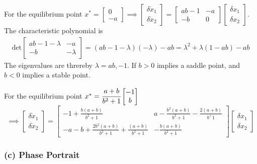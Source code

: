 For the equilibrium point \( x^* = \begin{bmatrix} 0 \\ -a \end{bmatrix} \implies
\begin{bmatrix} \delta \dot x_1 \\ \delta \dot x_2 \end{bmatrix}
=
\begin{bmatrix}
    ab-1 & -a \\
    -b   & 0
\end{bmatrix}
\begin{bmatrix} \delta x_1 \\ \delta x_2 \end{bmatrix}\).\\
The characteristic polynomial is
\begin{align*}
    \text{det}
    \begin{bmatrix}
        ab - 1 - \lambda & -a       \\
        -b               & -\lambda
    \end{bmatrix}
    =
    (ab - 1 - \lambda)(-\lambda) - a b
    =
    \lambda^2 + \lambda (1 - ab) - ab
\end{align*}
The eigenvalues are threreby \( \lambda = ab, -1 \).
If \( b > 0 \) implies a saddle point, and \( b < 0 \) implies a stable point.

For the equilibrium point \( x^* = \cfrac{a+b}{b^2 + 1} \begin{bmatrix} -1 \\ b \end{bmatrix} \)
\[ \implies
    \begin{bmatrix} \delta \dot x_1 \\ \delta \dot x_2 \end{bmatrix}
    =
    \begin{bmatrix}
        -1 + \frac{b(a+b)}{b^2+1}                              & a - \frac{b^2(a+b)}{b^2+1}-\frac{2(a+b)}{b^+1} \\
        -a - b + \frac{2b^2(a+b)}{b^2+1} + \frac{(a+b)}{b^2+1} & -\frac{b(a+b)}{b^2+1}
    \end{bmatrix}
    \begin{bmatrix} \delta x_1 \\ \delta x_2 \end{bmatrix}
\]

\clearpage
\subsubsection*{(c) Phase Portrait}

